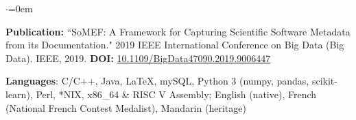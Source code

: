 \begin{list}{$\cdot$}{\leftmargin=0em} %
   \item \textbf{Publication:} ``SoMEF: A Framework for Capturing Scientific Software Metadata from its Documentation." 2019 IEEE International Conference on Big Data (Big Data). IEEE, 2019. \textbf{DOI:} \href{https://doi.org/10.1109/BigData47090.2019.9006447}{10.1109/BigData47090.2019.9006447}
   \item \textbf{Languages}: C/C++, Java, \LaTeX, mySQL, Python 3 (numpy, pandas, scikit-learn), Perl, *NIX, x86\_64 \& RISC V Assembly; English (native), French (National French Contest Medalist), Mandarin (heritage)
\end{list}
